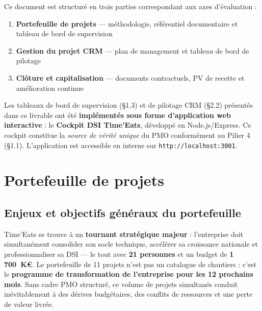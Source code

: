 \documentclass[11pt,a4paper,oneside]{report}
\begin{document}
Ce document est structuré en trois parties correspondant aux axes d'évaluation :
\begin{enumerate}
  \item \textbf{Portefeuille de projets} — méthodologie, référentiel documentaire et tableau de bord de supervision
  \item \textbf{Gestion du projet CRM} — plan de management et tableau de bord de pilotage
  \item \textbf{Clôture et capitalisation} — documents contractuels, PV de recette et amélioration continue
\end{enumerate}

\begin{reco}
Les tableaux de bord de supervision (§1.3) et de pilotage CRM (§2.2) présentés dans ce livrable ont été \textbf{implémentés sous forme d'application web interactive} : le \textbf{Cockpit DSI Time'Eats}, développé en Node.js/Express. Ce cockpit constitue la \textit{source de vérité unique} du PMO conformément au Pilier 4 (§1.1). L'application est accessible en interne sur \texttt{http://localhost:3001}.
\end{reco}

\newpage

\chapter{Portefeuille de projets}

\section{Enjeux et objectifs généraux du portefeuille}

\begin{finding}
Time'Eats se trouve à un \textbf{tournant stratégique majeur} : l'entreprise doit simultanément consolider son socle technique, accélérer sa croissance nationale et professionnaliser sa DSI — le tout avec \textbf{21 personnes} et un budget de \textbf{1\,700~K€}. Le portefeuille de 11 projets n'est pas un catalogue de chantiers : c'est le \textbf{programme de transformation de l'entreprise pour les 12 prochains mois}. Sans cadre PMO structuré, ce volume de projets simultanés conduit inévitablement à des dérives budgétaires, des conflits de ressources et une perte de valeur livrée.
\end{finding}
\end{document}
